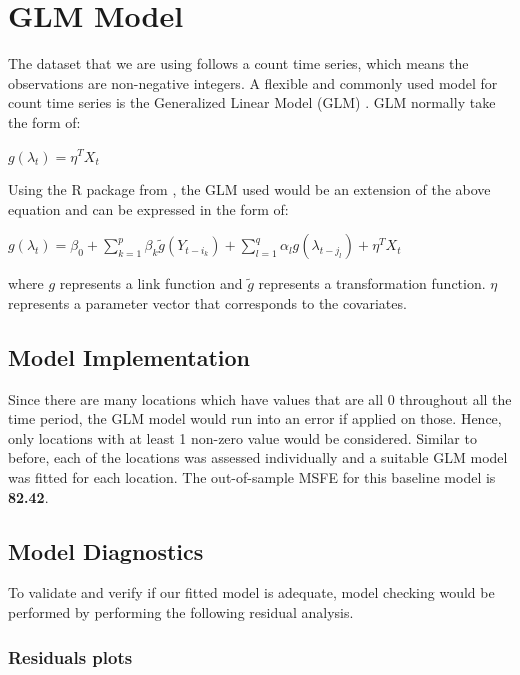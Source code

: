 \documentclass[12pt, letterpaper] {article}
\begin{document}
\section{GLM Model}
The dataset that we are using follows a count time series, which means the observations are non-negative integers. A flexible and commonly used model for count time series is the Generalized Linear Model (GLM) \cite{Nelder1972}. GLM normally take the form of:

\begin{center}
    $\displaystyle g(\lambda_t)= \eta^T X_t$
\end{center}

\noindent Using the R package from \cite{Tobias2017}, the GLM used would be an extension of the above equation and can be expressed in the form of:

\begin{center}
    $\displaystyle g(\lambda_t)=\beta_0 + \sum_{k=1}^{p}\beta_k\tilde{g}(Y_{t-i_k}) + \sum_{\mathit{l}=1}^{q}\alpha_\mathit{l} g(\lambda_{t-j_\mathit{l}}) + \eta^T X_t$
\end{center}

\noindent where $g$ represents a link function and $ \tilde{g}$ represents a transformation function. $\eta$ represents a parameter vector that corresponds to the covariates. 

\subsection{Model Implementation}
\noindent Since there are many locations which have values that are all 0 throughout all the time period, the GLM model would run into an error if applied on those. Hence, only locations with at least 1 non-zero value would be considered. Similar to before, each of the locations was assessed individually and a suitable GLM model was fitted for each location. The out-of-sample MSFE for this baseline model is \textbf{82.42}. 

\subsection{Model Diagnostics}
To validate and verify if our fitted model is adequate, model checking would be performed by performing the following residual analysis.	

\subsubsection{Residuals plots}
\end{document}
